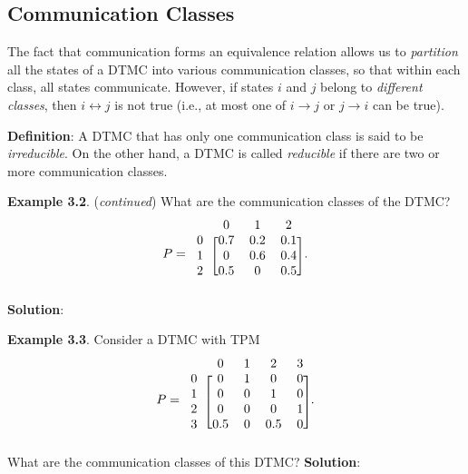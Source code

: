 \subsection*{Communication Classes}
The fact that communication forms an equivalence relation allows us to \emph{partition} all the states
of a DTMC into various communication classes, so that within each class, all states
communicate. However, if states $i$ and $j$ belong to \emph{different classes}, then $ i\leftrightarrow j $ is not true
(i.e., at most one of $ i\rightarrow j $ or $ j\rightarrow i $ can be true).
\begin{Regular}
    \textbf{Definition}: A DTMC that has only one communication class is said to be \emph{irreducible}. On the
    other hand, a DTMC is called \emph{reducible} if there are two or more communication classes.
\end{Regular}
\begin{Example}
    \textbf{Example 3.2}. (\emph{continued}) What are the communication classes of the DTMC\@?
    \[ P=\begin{blockarray}{ccccc}
            & 0 & 1 & 2 \\
            \begin{block}{c[cccc]}
                0 & 0.7  & 0.2  & 0.1 \\
                1 & 0 & 0.6 & 0.4 \\
                2 & 0.5 & 0 & 0.5 \\
            \end{block}
        \end{blockarray}. \]
    \tcblower{}
    \textbf{Solution}:
\end{Example}
\begin{Example}
    \textbf{Example 3.3}. Consider a DTMC with TPM
    \[ P=\begin{blockarray}{cccccc}
            & 0 & 1 & 2 & 3 \\
            \begin{block}{c[ccccc]}
                0 & 0 & 1 & 0 & 0 \\
                1 & 0 & 0 & 1 & 0 \\
                2 & 0 & 0 & 0 & 1 \\
                3 & 0.5 & 0 & 0.5 & 0\\
            \end{block}
        \end{blockarray}. \]
    What are the communication classes of this DTMC\@?
    \tcblower{}
    \textbf{Solution}:
\end{Example}
